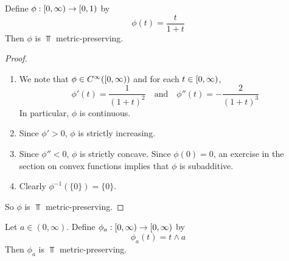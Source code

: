 \documentclass{book}
\begin{document}
\begin{ex} 
	Define $\phi:[0,\infty) \rightarrow [0,1)$ by 
	$$\phi(t) = \frac{t}{1+t}$$
	Then $\phi$ is $\Top$ metric-preserving.
\end{ex}

\begin{proof}\
	\begin{enumerate}
		\item We note that $\phi \in C^{\infty}([0,\infty))$ and for each $t \in [0,\infty)$, 
		$$\phi'(t) = \frac{1}{(1+t)^2} \quad \text{and} \quad \phi''(t) = -\frac{2}{(1+t)^3}$$
		In particular, $\phi$ is continuous.
		\item Since $\phi' > 0$, $\phi$ is strictly increasing. 
		\item Since $\phi'' < 0$, $\phi$ is strictly concave. Since $\phi(0) = 0$, an exercise in the section on convex functions implies that $\phi$ is subadditive. 
		\item Clearly $\phi^{-1}(\{0\}) = \{0\}$.
	\end{enumerate}	
	So $\phi$ is $\Top$ metric-preserving.
\end{proof}

\begin{ex} 
	Let $a \in (0, \infty)$. Define $\phi_a:[0,\infty) \rightarrow [0,\infty)$ by 
	$$\phi_a(t) = t \wedge a$$
	Then $\phi_a$ is $\Top$ metric-preserving.
\end{ex}
\end{document}
